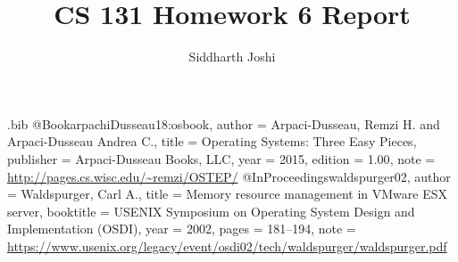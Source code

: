 \usepackage{filecontents}

\begin{filecontents}{\jobname.bib}
@Book{arpachiDusseau18:osbook,
  author =       {Arpaci-Dusseau, Remzi H. and Arpaci-Dusseau Andrea C.},
  title =        {Operating Systems: Three Easy Pieces},
  publisher =    {Arpaci-Dusseau Books, LLC},
  year =         2015,
  edition =      {1.00},
  note =         {\url{http://pages.cs.wisc.edu/~remzi/OSTEP/}}
}
@InProceedings{waldspurger02,
  author =       {Waldspurger, Carl A.},
  title =        {Memory resource management in {VMware ESX} server},
  booktitle =    {USENIX Symposium on Operating System Design and
                  Implementation (OSDI)},
  year =         2002,
  pages =        {181--194},
  note =         {\url{https://www.usenix.org/legacy/event/osdi02/tech/waldspurger/waldspurger.pdf}}}
\end{filecontents}



\date{}

\title{\Large \bf CS 131 Homework 6 Report}

\author{
{\rm Siddharth Joshi}\\
} %

\maketitle

